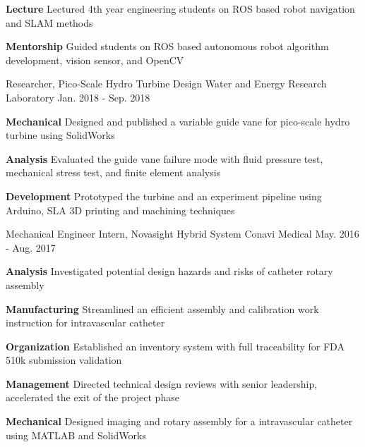 \begin{cventries}
	{}
	{
		\begin{cvitems}
			\item {
				\textbf{Lecture} Lectured 4th year engineering students on ROS based robot navigation and SLAM methods
			}
			\item {
				\textbf{Mentorship} Guided students on ROS based autonomous robot algorithm development, vision sensor, and OpenCV
			}
		\end{cvitems}
	}
	\cventry
	{Researcher, Pico-Scale Hydro Turbine Design}
	{Water and Energy Research Laboratory}
	{Jan. 2018 - Sep. 2018}
	{}
	{
		\begin{cvitems}
			\item {\textbf{Mechanical} Designed and published a variable guide vane for pico-scale hydro turbine using SolidWorks}
			\item {\textbf{Analysis} Evaluated the guide vane failure mode with fluid pressure test, mechanical stress test, and finite element analysis}
			\item {\textbf{Development} Prototyped the turbine and an experiment pipeline using Arduino, SLA 3D printing and machining techniques}
		\end{cvitems}
	}
	\cventry
	{Mechanical Engineer Intern, Novasight Hybrid System}
	{Conavi Medical} 
	{May. 2016 - Aug. 2017}
	{}
	{
		\begin{cvitems}
			\item {
				\textbf{Analysis} Investigated potential design hazards and risks of catheter rotary assembly
			}
			\item {
				\textbf{Manufacturing} Streamlined an efficient assembly and calibration work instruction for intravascular catheter}
			\item {
				\textbf{Organization} Established an inventory system with full traceability for FDA 510k submission validation}
			\item {
				\textbf{Management} Directed technical design reviews with senior leadership, accelerated the exit of the project phase}
			\item {
				\textbf{Mechanical} Designed imaging and rotary assembly for a intravascular catheter using MATLAB and SolidWorks
			}
		\end{cvitems}
	}
\end{cventries}
